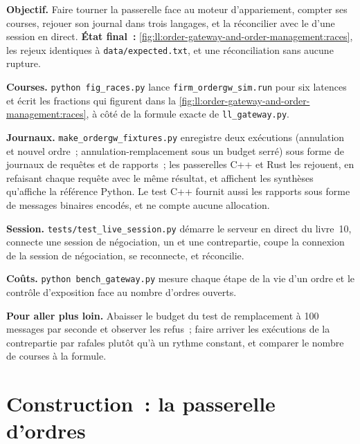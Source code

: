 \begin{tutorial}
\textbf{Objectif.} Faire tourner la passerelle face au moteur d'appariement, compter ses courses, rejouer son journal dans trois langages, et
la réconcilier avec le  d'une session en direct. \textbf{État final~:}
\cref{fig:ll:order-gateway-and-order-management:races}, les rejeux identiques à \texttt{data/expected.txt}, et une réconciliation
sans aucune rupture.
\begin{tutsteps}
\item \textbf{Courses.} \texttt{python fig\_races.py} lance \texttt{firm\_ordergw\_sim.run} pour six latences et écrit les
fractions qui figurent dans la \cref{fig:ll:order-gateway-and-order-management:races}, à côté de la formule exacte de \texttt{ll\_gateway.py}.
\item \textbf{Journaux.} \texttt{make\_ordergw\_fixtures.py} enregistre deux exécutions (annulation et nouvel ordre~; annulation-remplacement sous un
budget serré) sous forme de journaux de requêtes et de rapports~; les passerelles C++ et Rust les rejouent, en refaisant chaque requête avec le même
résultat, et affichent les synthèses qu'affiche la référence Python. Le test C++ fournit aussi les rapports sous forme de messages binaires encodés,
et ne compte aucune allocation.
\item \textbf{Session.}
\texttt{tests/test\_live\_session.py} démarre le serveur en direct du livre~10, connecte une session de négociation, un  et une contrepartie, coupe la connexion de la session de négociation, se reconnecte, et réconcilie.
\item \textbf{Coûts.} \texttt{python bench\_gateway.py} mesure chaque étape de la vie d'un ordre et le contrôle d'exposition face au
nombre d'ordres ouverts.
\end{tutsteps}
\textbf{Pour aller plus loin.} Abaisser le budget du test de remplacement à 100 messages par seconde et observer les refus~; faire
arriver les exécutions de la contrepartie par rafales plutôt qu'à un rythme constant, et comparer le nombre de courses à la formule.
\end{tutorial}

\section{Construction~: la passerelle d'ordres}\label{bld:ll:order-gateway-and-order-management:ordergw}


